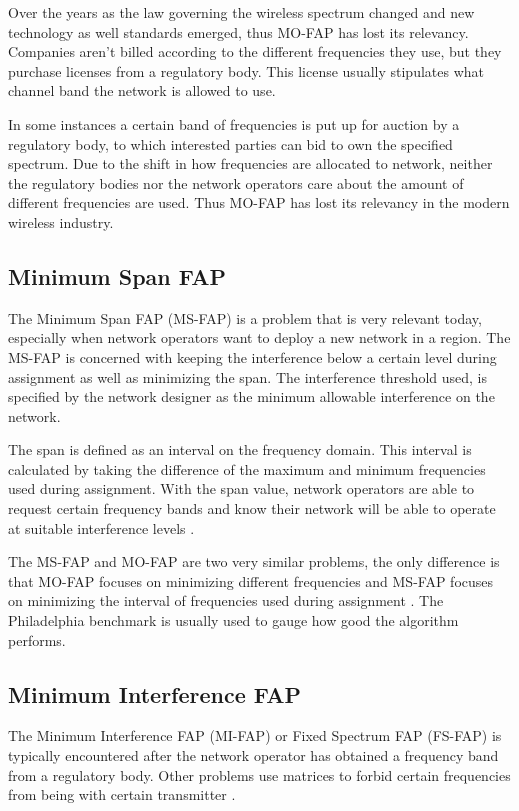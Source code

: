 Over the years as the law governing the wireless spectrum changed and new technology as well standards emerged, thus MO-FAP has lost its relevancy. Companies aren't billed according to the different frequencies they use, but they purchase licenses from a regulatory body. This license usually stipulates what channel band the network is allowed to use.

In some instances a certain band of frequencies is put up for auction by a regulatory body, to which interested parties can bid to own the specified spectrum. Due to the shift in how frequencies are allocated to network, neither the regulatory bodies nor the network operators care about the amount of different frequencies are used. Thus MO-FAP has lost its relevancy in the modern wireless industry.
\subsection{Minimum Span FAP}
The Minimum Span FAP (MS-FAP) is a problem that is very relevant today, especially when network operators want to deploy a new network in a region. The MS-FAP is concerned with keeping the interference below a certain level during assignment as well as minimizing the span. The interference threshold used, is specified by the network designer as the minimum allowable interference on the network.

The span is defined as an interval on the frequency domain. This interval is calculated by taking the difference of the maximum and minimum frequencies used during assignment. With the span value, network operators are able to request certain frequency bands and know their network will be able to operate at suitable interference levels \cite{Karen2004,MontemanniThesis,MSFAP}.

The MS-FAP and MO-FAP are two very similar problems, the only difference is that MO-FAP focuses on minimizing different frequencies and MS-FAP focuses on minimizing the interval of frequencies used during assignment \cite{Karen2004}. The Philadelphia benchmark is usually used to gauge how good the algorithm performs.
\subsection{Minimum Interference FAP}
The Minimum Interference FAP (MI-FAP) or Fixed Spectrum FAP (FS-FAP) is typically encountered after the network operator has obtained a frequency band from a regulatory body. Other problems use matrices to forbid certain frequencies from being with certain transmitter \cite{Karen2004,Eisenblatter,MontemanniThesis,MultipleBinaryFAP}. 

